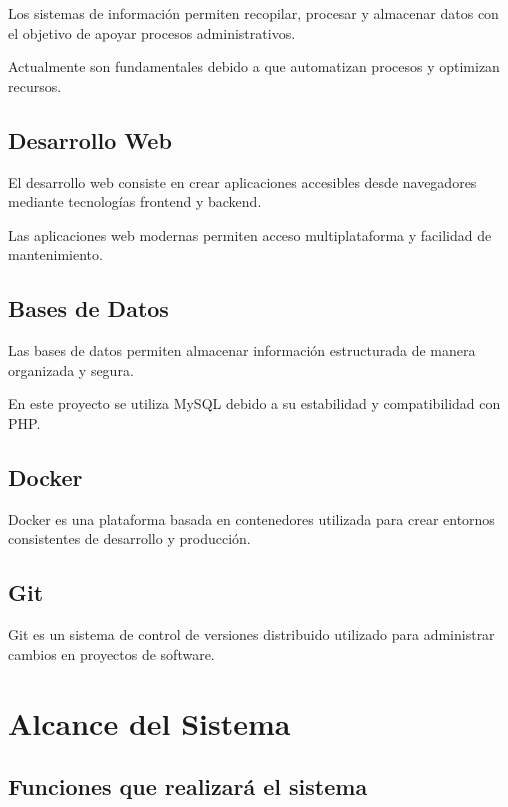 \documentclass[12pt,letterpaper,oneside]{extreport}
\begin{document}
Los sistemas de información permiten recopilar, procesar y almacenar datos con el objetivo de apoyar procesos administrativos.

Actualmente son fundamentales debido a que automatizan procesos y optimizan recursos.

\section{Desarrollo Web}

El desarrollo web consiste en crear aplicaciones accesibles desde navegadores mediante tecnologías frontend y backend.

Las aplicaciones web modernas permiten acceso multiplataforma y facilidad de mantenimiento.

\section{Bases de Datos}

Las bases de datos permiten almacenar información estructurada de manera organizada y segura.

En este proyecto se utiliza MySQL debido a su estabilidad y compatibilidad con PHP.

\section{Docker}

Docker es una plataforma basada en contenedores utilizada para crear entornos consistentes de desarrollo y producción.

\section{Git}

Git es un sistema de control de versiones distribuido utilizado para administrar cambios en proyectos de software.

\chapter{Alcance del Sistema}

\section{Funciones que realizará el sistema}
\end{document}
